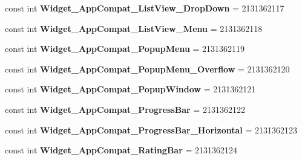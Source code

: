 \begin{DoxyCompactItemize}
const int {\bfseries Widget\+\_\+\+App\+Compat\+\_\+\+List\+View\+\_\+\+Drop\+Down} = 2131362117
\item 
\mbox{\label{class_pinned_app_1_1_droid_1_1_resource_1_1_style_aa54450b25ac073456f1804b803e27135}} 
const int {\bfseries Widget\+\_\+\+App\+Compat\+\_\+\+List\+View\+\_\+\+Menu} = 2131362118
\item 
\mbox{\label{class_pinned_app_1_1_droid_1_1_resource_1_1_style_a89159ec962b775b1e0bcfeb919d8b1e9}} 
const int {\bfseries Widget\+\_\+\+App\+Compat\+\_\+\+Popup\+Menu} = 2131362119
\item 
\mbox{\label{class_pinned_app_1_1_droid_1_1_resource_1_1_style_a2608020ab2b5a405d644c08aecf1d0d7}} 
const int {\bfseries Widget\+\_\+\+App\+Compat\+\_\+\+Popup\+Menu\+\_\+\+Overflow} = 2131362120
\item 
\mbox{\label{class_pinned_app_1_1_droid_1_1_resource_1_1_style_a5f80e0e9329084a4bb34448afb3c02f1}} 
const int {\bfseries Widget\+\_\+\+App\+Compat\+\_\+\+Popup\+Window} = 2131362121
\item 
\mbox{\label{class_pinned_app_1_1_droid_1_1_resource_1_1_style_a5fc3dfe5d1af1a1e7c69e9085c826781}} 
const int {\bfseries Widget\+\_\+\+App\+Compat\+\_\+\+Progress\+Bar} = 2131362122
\item 
\mbox{\label{class_pinned_app_1_1_droid_1_1_resource_1_1_style_ab11d2ea0f1f8d3fe57e57d26838aa523}} 
const int {\bfseries Widget\+\_\+\+App\+Compat\+\_\+\+Progress\+Bar\+\_\+\+Horizontal} = 2131362123
\item 
\mbox{\label{class_pinned_app_1_1_droid_1_1_resource_1_1_style_af9634d3ec56fe1b104ac003b16873672}} 
const int {\bfseries Widget\+\_\+\+App\+Compat\+\_\+\+Rating\+Bar} = 2131362124
\item 
\mbox{\label{class_pinned_app_1_1_droid_1_1_resource_1_1_style_a402a53e1809d528b3daa049dac7be8ff}} 

\end{DoxyCompactItemize}
